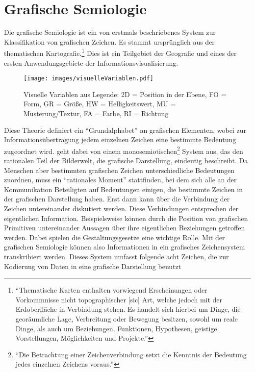 \documentclass[a4paper, 
               12pt,
               DIV=calc,
               version=first,
               pdftex,
               headsepline,
               footsepline,
               bibliography=totocnumbered,
               listof=numbered]{scrreprt}
\begin{document}
\section{Grafische Semiologie}
\label{sec:grafischeSemiologie}
Die grafische Semiologie ist ein von \cite{Bertin} erstmals beschriebenes System zur Klassifikation von grafischen Zeichen.
Es stammt ursprünglich aus der thematischen Kartografie.\footnote{"`Thematische Karten enthalten vorwiegend
Erscheinungen oder Vorkommnisse nicht topographischer [sic] Art, welche jedoch mit der Erdoberfläche in Verbindung
stehen. Es handelt sich hierbei um Dinge, die georäumliche Lage, Verbreitung oder Bewegung besitzen, sowohl
um reale Dinge, als auch um Beziehungen, Funktionen, Hypothesen, geistige Vorstellungen, Möglichkeiten und
Projekte."'\citep{Gitta} } Dies ist ein Teilgebiet der Geografie und eines der ersten Anwendungsgebiete der
Informationsvisualisierung.
\begin{figure}
\centering
\texttt{[image: images/visuelleVariablen.pdf]}
\caption{Visuelle Variablen aus \citep[S.\,51]{Bertin} Legende: 2D = Position in der Ebene, FO = Form, GR = Größe,
HW = Helligkeitswert, MU = Musterung/Textur, FA = Farbe, RI = Richtung}
\label{fig:visuelleVariablen}
\end{figure}
Diese Theorie definiert ein "`Grundalphabet"' an grafischen Elementen, wobei zur Informationsübertragung
jedem einzelnen Zeichen eine bestimmte Bedeutung zugeordnet wird. \cite{Bertin} geht dabei von einem
monosemiotischen\footnote{"`Die Betrachtung einer Zeichenverbindung setzt die Kenntnis der Bedeutung jedes
einzelnen Zeichens voraus."'\citep[S.\,3]{Bertin}} System aus, das den rationalen Teil der Bilderwelt, die
grafische Darstellung, eindeutig beschreibt.
Da Menschen aber bestimmten grafischen Zeichen unterschiedliche Bedeutungen zuordnen, muss ein "`rationales Moment"'
stattfinden, bei dem sich alle an der Kommunikation Beteiligten auf Bedeutungen einigen,
die bestimmte Zeichen in der grafischen Darstellung haben. Erst dann kann über die Verbindung der Zeichen untereinander diskutiert
werden. Diese Verbindungen entsprechen der eigentlichen Information. Beispielsweise können
durch die Position von grafischen Primitiven untereinander Aussagen über ihre eigentlichen Beziehungen getroffen werden.
Dabei spielen die Gestaltungsgesetze eine wichtige Rolle.
Mit der grafischen Semiologie können also Informationen in ein grafisches Zeichensystem
transkribiert werden. Dieses System umfasst folgende acht Zeichen, die zur Kodierung von Daten in eine grafische Darstellung benutzt
\end{document}
